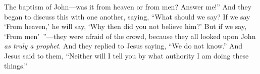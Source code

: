 \begin{biblechapter}
\verse The baptism of John—was it from heaven or from men? Answer me!”
\verse And they began to discuss this with one another, saying, “What should we say? If we say ‘From heaven,’ he will say, ‘Why then did you not believe him?’
\verse But if we say, ‘From men’ ”—they were afraid of the crowd, because they all looked upon John \textit{as truly a prophet}.
\verse And they replied to Jesus saying, “We do not know.” And Jesus said to them, “Neither will I tell you by what authority I am doing these things.”
\end{biblechapter}

